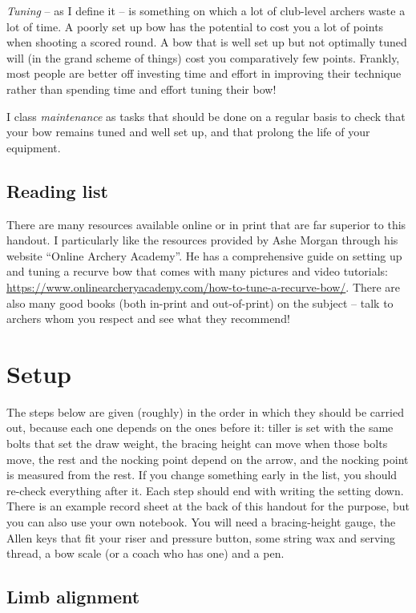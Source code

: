 \documentclass[11pt]{article}
\let\plainsubsection\subsection
\renewcommand{\subsection}{\FloatBarrier\plainsubsection}
\begin{document}
\textit{Tuning} -- as I define it -- is something on which a lot of club-level archers waste a lot of time. A poorly set up bow has the potential to cost you a lot of points when shooting a scored round. A bow that is well set up but not optimally tuned will (in the grand scheme of things) cost you comparatively few points. Frankly, most people are better off investing time and effort in improving their technique rather than spending time and effort tuning their bow!

I class \textit{maintenance} as tasks that should be done on a regular basis to check that your bow remains tuned and well set up, and that prolong the life of your equipment.

\subsection{Reading list}
There are many resources available online or in print that are far superior to this handout. I particularly like the resources provided by Ashe Morgan through his website ``Online Archery Academy''. He has a comprehensive guide on setting up and tuning a recurve bow that comes with many pictures and video tutorials: \url{https://www.onlinearcheryacademy.com/how-to-tune-a-recurve-bow/}. There are also many good books (both in-print and out-of-print) on the subject -- talk to archers whom you respect and see what they recommend!

\section{Setup}
\label{sec:setup}

The steps below are given (roughly) in the order in which they should be carried out, because each one depends on the ones before it: tiller is set with the same bolts that set the draw weight, the bracing height can move when those bolts move, the rest and the nocking point depend on the arrow, and the nocking point is measured from the rest. If you change something early in the list, you should re-check everything after it. Each step should end with writing the setting down. There is an example record sheet at the back of this handout for the purpose, but you can also use your own notebook. You will need a bracing-height gauge, the Allen keys that fit your riser and pressure button, some string wax and serving thread, a bow scale (or a coach who has one) and a pen.

\subsection{Limb alignment}
\end{document}
